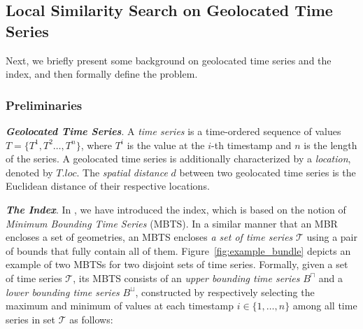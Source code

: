 \subsection{Local Similarity Search on Geolocated Time Series}
\label{sec:problem}

Next, we briefly present some background on geolocated time series and the \btsr index, and then formally define the problem. 


\subsubsection{Preliminaries}
\label{subsec:preliminaries}

\noindent \textbf{\emph{Geolocated Time Series}}. A {\em time series} is a time-ordered sequence of values $T = \{T^1, T^2 \ldots, T^{n}\}$, where $T^{i}$ is the value at the $i$-th timestamp and $n$ is the length of the series. A geolocated time series is additionally characterized by a \emph{location}, denoted by $T.loc$. The {\em spatial distance} $d$ between two geolocated time series is the Euclidean distance of their respective locations.




\noindent \textbf{\emph{The \btsr Index}}. In \cite{chatzig17btsr}, we have introduced the \btsr index, which is based on the notion of {\em Minimum Bounding Time Series} (MBTS). In a similar manner that an MBR encloses a set of geometries, an MBTS encloses {\em a set of time series} $\mathcal{T}$ using a pair of bounds that fully contain all of them. Figure~\ref{fig:example_bundle} depicts an example of two MBTSs for two disjoint sets of time series. Formally, given a set of time series $\mathcal{T}$, its MBTS consists of an \emph{upper bounding time series} $B^{\sqcap}$ and a \emph{lower bounding time series} $B^{\sqcup}$, constructed by respectively selecting the maximum and minimum of values at each timestamp $i \in \{ 1, \dots, n\}$ among all time series in set $\mathcal{T}$ as follows:

